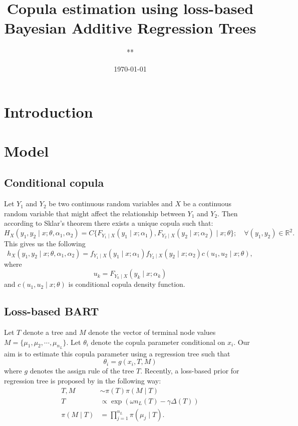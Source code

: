 \documentclass{amsart}
\title{Copula estimation using loss-based Bayesian Additive Regression Trees}
\author{**}
\date{\today}
\begin{document}
\maketitle

\section{Introduction}

\section{Model}

\subsection{Conditional copula}

Let $Y_1$ and $Y_2$ be two continuous random variables and $X$ be a continuous random variable 
that might affect the relationship between $Y_1$ and $Y_2$. 
Then according to Sklar’s theorem there exists a unique copula such that:
\begin{equation}
    H_{X}(y_1,y_2\mid x; \theta, \alpha_1, \alpha_2) = C\{F_{Y_1\mid X}(y_1\mid x;\alpha_1),F_{Y_2\mid X}(y_2\mid x; \alpha_2)\mid x;\theta\}; \quad \forall (y_1,y_2) \in \mathbb{R}^2.
\end{equation}
This gives us the following
\begin{equation}
    h_{X}(y_1,y_2\mid x; \theta, \alpha_1, \alpha_2) = f_{Y_1\mid X}(y_1\mid x;\alpha_1)f_{Y_2\mid X}(y_2\mid x; \alpha_2)c(u_1,u_2\mid x;\theta),
\end{equation}
where
\begin{equation}\label{eq:emp_dist:Y}
    u_k = F_{Y_k\mid X}(y_k\mid x; \alpha_k)
\end{equation}
and $c(u_1,u_2\mid x;\theta)$ is conditional copula density function.

\subsection{Loss-based BART}

Let $T$ denote a tree and $M$ denote the vector of terminal node values $M = \{\mu_1,\mu_2, \cdots, \mu_{n_L}\}$. Let $\theta_i$ denote the copula parameter conditional on $x_i$. Our aim is to estimate this copula parameter using a regression tree such that
\begin{equation}
	\theta_i = g(x_i, T, M)
\end{equation}
where $g$ denotes the assign rule of the tree $T$. Recently, 
a loss-based prior for regression tree is proposed by \citet{serafini2024lossbasedpriortreetopologies} in the following way:
\begin{align}
	T, M &\sim \pi(T)\pi(M\mid T)\\
	T &\propto \exp\left(\omega n_L(T)-\gamma\Delta(T)\right)\\
	\pi(M\mid T) & = \prod_{j=1}^{n_L}\pi(\mu_j\mid T).
\end{align}
\end{document}
